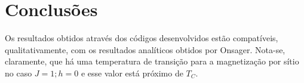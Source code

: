 \section{Conclusões}

Os resultados obtidos através dos códigos desenvolvidos estão compatíveis, qualitativamente, com os resultados analíticos obtidos por Onsager. Nota-se, claramente, que há uma temperatura de transição para a magnetização por sítio no caso $J = 1; h = 0$ e esse valor está próximo de $T_C$.